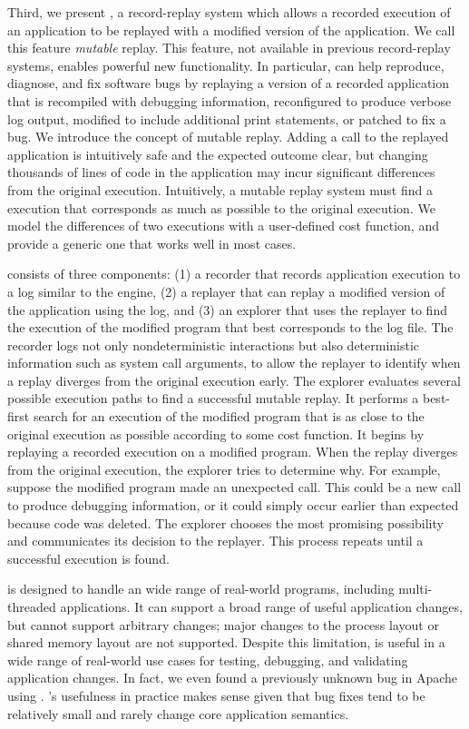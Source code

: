 Third, we present \dora, a record-replay system which
allows a recorded execution of an application to be replayed with a modified
version of the application. We call this feature {\em mutable}
replay.  This feature, not available in previous
record-replay systems, enables powerful new functionality. In particular, \dora
can help reproduce, diagnose, and fix software bugs by replaying a version of a
recorded application that is recompiled with debugging information, reconfigured
to produce verbose log output, modified to include additional print statements,
or patched to fix a bug.
We introduce the concept of mutable replay. Adding a  call
to the replayed application is intuitively safe and the expected outcome clear,
but changing thousands of lines of code in the application may incur significant
differences from the original execution. Intuitively, a mutable replay system
must find a execution that corresponds as much as possible to the original
execution. We model the differences of two executions with a user-defined cost
function, and provide a generic one that works well in most cases.

\dora consists of three components: (1) a recorder that records application
execution to a log similar to the \scribe engine, (2) a replayer that can replay
a modified version of the application using the log, and (3) an explorer that
uses the replayer to find the execution of the modified program that best
corresponds to the log file. The recorder logs not only nondeterministic
interactions but also deterministic information such as system call arguments,
to allow the replayer to identify when a replay diverges from the original
execution early.
The explorer evaluates several possible execution paths to find a successful
mutable replay. It performs a best-first search for an execution of
the modified program that is as close to the original execution as
possible according to some cost function. It begins by replaying a
recorded execution on a modified program. When the replay diverges
from the original execution, the explorer tries to determine
why. For example, suppose the modified program made an unexpected
 call. This could be a new call to produce debugging
information, or it could simply occur earlier than expected because
code was deleted. The explorer chooses the most promising possibility
and communicates its decision to the replayer. This process repeats
until a successful execution is found.

{\dora} is designed to handle an wide range of real-world programs, including
multi-threaded applications. It can support a broad range of useful application
changes, but cannot support arbitrary changes; major changes to the process
layout or shared memory layout are not supported. Despite this limitation,
{\dora} is useful in a wide range of real-world use cases for testing,
debugging, and validating application changes. In fact, we even found a
previously unknown bug in Apache using {\dora}. {\dora}'s usefulness in practice
makes sense given that bug fixes tend to be relatively small and rarely change
core application semantics.

